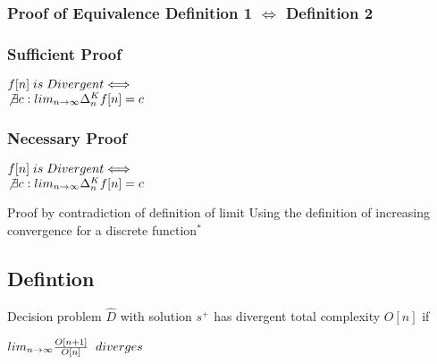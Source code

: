 \documentclass[11pt]{article}
\begin{document}
\subsubsection{Proof of Equivalence Definition 1 $\Leftrightarrow$ Definition 2}

\subsubsection{Sufficient Proof}
\begin{center}
\vspace{2mm}
$
f[n]\hspace{1mm} is \hspace{1mm} Divergent \Longleftrightarrow
$
\\ \vspace{4mm}
$
\not \exists c: lim_{n\rightarrow \infty} \Delta_n^K f[n] = c
$
\end{center}



\subsubsection{Necessary Proof}
\begin{center}
\vspace{2mm}
$
f[n]\hspace{1mm} is \hspace{1mm} Divergent \Longleftrightarrow
$
\\ \vspace{4mm}
$
\not \exists c: lim_{n\rightarrow \infty} \Delta_n^K f[n] = c
$
\end{center}








Proof by contradiction of definition of limit
Using the definition of increasing convergence for a discrete function$^*$




\subsection{Defintion}
Decision problem $\hat{D}$ with solution $s^+$ has divergent total complexity $O[n]$ if
\begin{center}
$
lim_{n \rightarrow \infty} \frac{O[n+1]}{O[n]} \hspace{2mm} diverges
$
\end{center}
\end{document}
